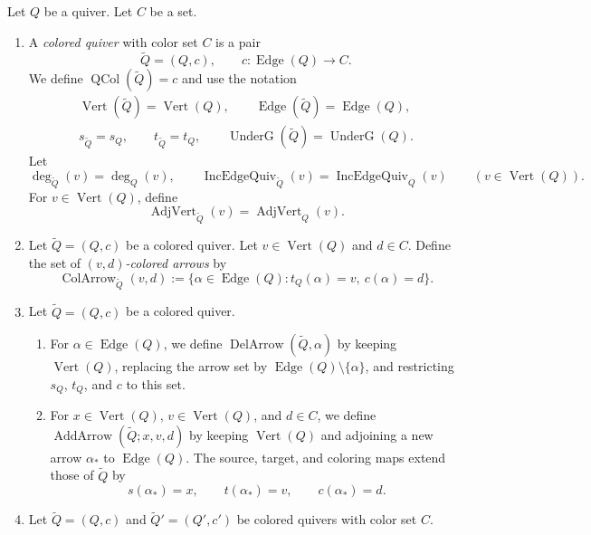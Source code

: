 \begin{definition}\label{def:colored-quivers}
Let $Q$ be a quiver. Let $C$ be a set.
\begin{enumerate}[font=\itshape]
\item A \textit{colored quiver} with color set $C$ is a pair
\[
 \widetilde Q=(Q,c),\qquad c:\operatorname{Edge}(Q)\longrightarrow C.
\]
We define $\operatorname{QCol}(\widetilde Q)=c$ and use the notation
\[
\begin{gathered}
 \operatorname{Vert}(\widetilde Q)=\operatorname{Vert}(Q),\qquad
 \operatorname{Edge}(\widetilde Q)=\operatorname{Edge}(Q),\\
 s_{\widetilde Q}=s_Q,\qquad t_{\widetilde Q}=t_Q,\qquad
 \operatorname{UnderG}(\widetilde Q)=\operatorname{UnderG}(Q).
\end{gathered}
\]
Let
\[
 \deg_{\widetilde Q}(v)=\deg_Q(v),\qquad
 \operatorname{IncEdgeQuiv}_{\widetilde Q}(v)=\operatorname{IncEdgeQuiv}_Q(v)
 \qquad(v\in\operatorname{Vert}(Q)).
\]
For $v\in\operatorname{Vert}(Q)$, define
\[
 \operatorname{AdjVert}_{\widetilde Q}(v)=\operatorname{AdjVert}_Q(v).
\]
\item\label{d:colored-arrow} Let $\widetilde Q=(Q,c)$ be a colored quiver. Let $v\in\operatorname{Vert}(Q)$ and $d\in C$.
Define the set of \textit{$(v,d)$-colored arrows} by
\[
 \operatorname{ColArrow}_{\widetilde Q}(v,d)
 :=\{\alpha\in\operatorname{Edge}(Q):t_Q(\alpha)=v,\ c(\alpha)=d\}.
\]
\item\label{d:arrow-operators} Let $\widetilde Q=(Q,c)$ be a colored quiver.
\begin{enumerate}[label=(\alph*),ref=\alph*,font=\itshape]
\item\label{d:delete-arrow} For $\alpha\in\operatorname{Edge}(Q)$, we define
$\operatorname{DelArrow}(\widetilde Q,\alpha)$ by keeping $\operatorname{Vert}(Q)$,
replacing the arrow set by $\operatorname{Edge}(Q)\setminus\{\alpha\}$,
and restricting $s_Q$, $t_Q$, and $c$ to this set.
\item\label{d:add-arrow} For $x\in\operatorname{Vert}(Q)$, $v\in\operatorname{Vert}(Q)$, and $d\in C$, we define
$\operatorname{AddArrow}(\widetilde Q;x,v,d)$ by keeping $\operatorname{Vert}(Q)$
and adjoining a new arrow $\alpha_*$ to $\operatorname{Edge}(Q)$.
The source, target, and coloring maps extend those of $\widetilde Q$ by
\[
 s(\alpha_*)=x,\qquad t(\alpha_*)=v,\qquad c(\alpha_*)=d.
\]
\end{enumerate}
\item Let $\widetilde Q=(Q,c)$ and $\widetilde Q'=(Q',c')$ be colored quivers with color set $C$.

\end{enumerate}
\end{definition}
